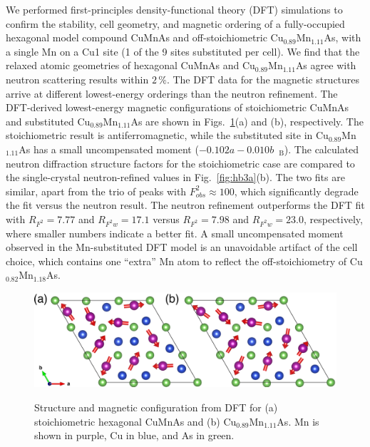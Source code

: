 \documentclass[letterpaper,10pt,doublespacing,edeposit]{uiucthesis2020}
\newcommand*{\cumnas}{Cu$_{0.82}$Mn$_{1.18}$As}
\begin{document}
\begin{mainmatter}
We performed first-principles density-functional theory (DFT) simulations to confirm the stability, cell geometry, and magnetic
ordering of a fully-occupied hexagonal model compound CuMnAs and off-stoichiometric Cu$_{0.89}$Mn$_{1.11}$As, with a single Mn on a Cu1 site (1 of the 9 sites substituted per cell).
We find that the relaxed atomic geometries of hexagonal CuMnAs and Cu$_{0.89}$Mn$_{1.11}$As agree with neutron scattering results within $2\,\%$.
The DFT data for the magnetic structures arrive at different lowest-energy orderings than the neutron refinement. 
The DFT-derived lowest-energy magnetic configurations
of stoichiometric CuMnAs and substituted Cu$_{0.89}$Mn$_{1.11}$As are shown in Figs.\ \ref{fig:DFT-mag}(a) and (b), respectively.
The stoichiometric result is antiferromagnetic, while 
the substituted site in Cu$_{0.89}$Mn$_{1.11}$As has a small uncompensated moment ($-0.102a - 0.010b$~\textmu$_\mathrm{B}$). 
The calculated neutron diffraction structure factors for the stoichiometric case  are compared
to the single-crystal neutron-refined values
in Fig.\ \ref{fig:hb3a}(b). 
The two fits are similar, apart from  the trio of peaks with $F_{obs}^2 \approx 100$,
which significantly degrade the fit versus the neutron result.
The neutron refinement outperforms the DFT fit with $R_{F^2} = 7.77$ and $R_{F^2w} = 17.1$ versus $R_{F^2} = 7.98$ and $R_{F^2w} =23.0$, respectively, where smaller numbers indicate a better fit. 
{\color{black}A small uncompensated moment observed in the Mn-substituted DFT model is an unavoidable artifact of the cell choice, which contains one ``extra'' Mn atom to reflect the off-stoichiometry of \cumnas.}


\begin{figure}
\centering\includegraphics[width=\columnwidth]{figures/ch5/h-cumnas_1x1_dft.png} \\
\caption{\label{fig:DFT-mag}
Structure and magnetic configuration from DFT for (a) stoichiometric hexagonal CuMnAs and (b) Cu$_{0.89}$Mn$_{1.11}$As. 
Mn is shown in purple, Cu in blue, and As in green.
}
\end{figure}



\end{mainmatter}
\end{document}
